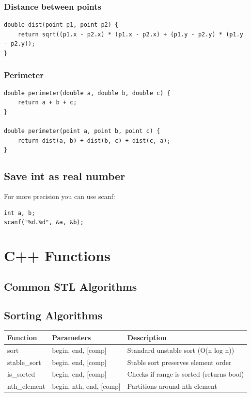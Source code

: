 \documentclass[10pt]{article}
\begin{document}
\begin{multicols*}{2}
\subsubsection{Distance between points}
\begin{lstlisting}[style=compactcpp]
double dist(point p1, point p2) {
    return sqrt((p1.x - p2.x) * (p1.x - p2.x) + (p1.y - p2.y) * (p1.y - p2.y));
}
\end{lstlisting}

\subsubsection{Perimeter}
\begin{lstlisting}[style=compactcpp]
double perimeter(double a, double b, double c) {
    return a + b + c;
}

double perimeter(point a, point b, point c) {
    return dist(a, b) + dist(b, c) + dist(c, a);
}
\end{lstlisting}

\subsection{Save int as real number}
For more precision you can use scanf:
\begin{lstlisting}[style=compactcpp]
int a, b;
scanf("%d.%d", &a, &b);
\end{lstlisting}

\section{C++ Functions}
\subsection{Common STL Algorithms}

\subsection*{Sorting Algorithms}
\begin{tabularx}{\linewidth}{|l|l|X|}
    \hline
    \textbf{Function} & \textbf{Parameters} & \textbf{Description} \\
    \hline
    sort & begin, end, [comp] & Standard unstable sort (O(n log n)) \\
    \hline
    stable\_sort & begin, end, [comp] & Stable sort preserves element order \\
    \hline
    is\_sorted & begin, end, [comp] & Checks if range is sorted (returns bool) \\
    \hline
    nth\_element & begin, nth, end, [comp] & Partitions around nth element \\
    \hline
\end{tabularx}


\end{multicols*}
\end{document}

